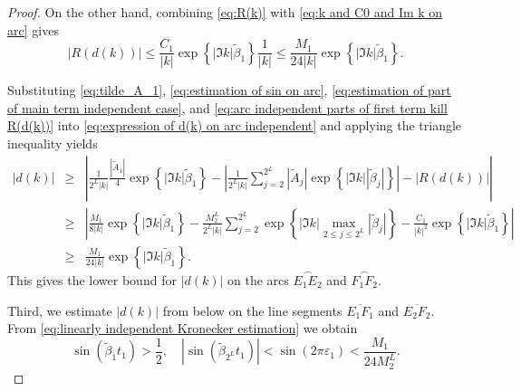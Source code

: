 \documentclass[11pt,reqno]{amsart}
\theoremstyle{definition}
\theoremstyle{remark}
\numberwithin{equation}{section}
\begin{document}
\begin{proof}
On the other hand, combining \eqref{eq:R(k)} with \eqref{eq:k and C0 and Im k on arc} gives
\begin{equation}\label{eq:arc independent parts of first term kill R(d(k))}
	|R(d(k))| \leq \frac{C_1}{|k|}\exp{\left\{\left|\Im k\right|\tilde{\beta}_1\right\}}\frac{1}{|k|}\leq  \frac{M_1}{24|k|}\exp{\left\{\left|\Im k\right|\tilde{\beta}_1\right\}}.
\end{equation}

Substituting \eqref{eq:tilde_A_1}, \eqref{eq:estimation of sin on arc}, \eqref{eq:estimation of part of main term independent case}, and \eqref{eq:arc independent parts of first term kill R(d(k))} into \eqref{eq:expression of d(k) on arc independent} and applying the triangle inequality yields
\begin{eqnarray}\label{eq:tentative estimation of d(k) on arc independent}
		\left| d(k) \right|& \geq & \left| \frac{1}{2^L |k|} \frac{\left|\tilde{A}_1\right|}{4}\exp{\left\{\left|\Im k\right|\tilde{\beta}_1\right\}}-\left|\frac{1}{2^L \left|k\right|}\sum_{j=2}^{2^L}\left|\tilde{A}_j\right|\exp{\left\{\left|\Im k\right| \left|\tilde{\beta}_j\right|\right\}}\right|-\left| R(d(k)) \right|\right| \nonumber \\
		& \geq & \left| \frac{M_1}{8\left|k\right|}\exp{\left\{\left|\Im k\right|\tilde{\beta}_1\right\}}-\frac{M_2^L}{2^L |k|}\sum_{j=2}^{2^L}\exp{\left\{\left|\Im k\right| \max_{2\leq j\leq 2^L}{\left|\tilde{\beta}_j\right|}\right\}}-\frac{C_1}{\left|k\right|^2}\exp{\left\{\left|\Im k\right| \tilde{\beta}_1\right\}} \right| \nonumber\\
&\geq &\frac{M_1}{24|k|}\exp{\left\{\left|\Im k\right| \tilde{\beta}_1\right\}}.
\end{eqnarray}
This gives the lower bound for $|d(k)|$ on the arcs $\overset{\frown}{E_1E_2}$ and $\overset{\frown}{F_1F_2}$.

Third, we estimate $|d(k)|$ from below on the line segments $\overline{E_1F_1}$ and $\overline{E_2F_2}$. From \eqref{eq:linearly independent Kronecker estimation} we obtain
\begin{equation*}
 \sin{\left(\tilde{\beta}_1t_1\right)}>\frac{1}{2},\quad
 \left|\sin{\left(\tilde{\beta}_{2^L}t_1\right)}\right|<\sin{\left(2\pi\varepsilon_1\right)}<\frac{M_1}{24M_2^L}.
\end{equation*}


\end{proof}
\end{document}
